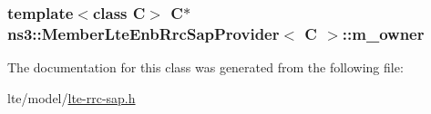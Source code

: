 \subsubsection[{\texorpdfstring{m\+\_\+owner}{m_owner}}]{\setlength{\rightskip}{0pt plus 5cm}template$<$class C$>$ {\bf C}$\ast$ {\bf ns3\+::\+Member\+Lte\+Enb\+Rrc\+Sap\+Provider}$<$ {\bf C} $>$\+::m\+\_\+owner\hspace{0.3cm}{\ttfamily [private]}}\hypertarget{classns3_1_1MemberLteEnbRrcSapProvider_a62b52961da85c1ebdc0f59b206f530e9}{}\label{classns3_1_1MemberLteEnbRrcSapProvider_a62b52961da85c1ebdc0f59b206f530e9}


The documentation for this class was generated from the following file\+:\begin{DoxyCompactItemize}
\item 
lte/model/\hyperlink{lte-rrc-sap_8h}{lte-\/rrc-\/sap.\+h}\end{DoxyCompactItemize}
